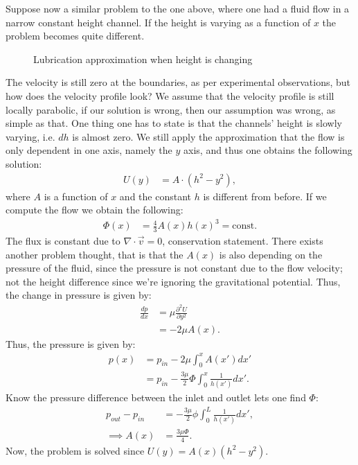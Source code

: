 \documentclass[a4paper]{article}
\begin{document}
\vspace*{0.5cm}\noindent
Suppose now a similar problem to the one above, where one had a fluid flow in a narrow constant height channel. If the height is varying as a function of $x$ the problem becomes quite different.
\begin{figure}[H]
    \centering
    \caption{Lubrication approximation when height is changing}
    \label{fig: Lubrication approximation height change}
\end{figure}\noindent
The velocity is still zero at the boundaries, as per experimental observations, but how does the velocity profile look?
We assume that the velocity profile is still locally parabolic, if our solution is wrong, then our assumption was wrong, as simple as that.
One thing one has to state is that the channels' height is slowly varying, i.e. $dh$ is almost zero. We still apply the approximation that the flow is only dependent in one axis, namely the $y$ axis, and thus one obtains the following solution:
\begin{align*}
    U(y) &= A\cdot\left(h^2 -y^2\right),
\end{align*}where $A$ is a function of $x$ and the constant $h$ is different from before. If we compute the flow we obtain the following:
\begin{align*}
    \Phi(x) &= \frac{4}{3}A(x)h(x)^3 = \text{const}.
\end{align*}The flux is constant due to $\nabla\cdot\vec{v} = 0$, conservation statement. There exists another problem thought, that is that the $A(x)$ is also depending on the pressure of the fluid, since the pressure is not constant due to the flow velocity; not the height difference since we're ignoring the gravitational potential.
Thus, the change in pressure is given by:
\begin{align*}
    \frac{d p}{d x} &= \mu\frac{\partial^2 U}{\partial y^2}\\
    &=-2\mu A(x).
\end{align*}Thus, the pressure is given by:
\begin{align*}
    p(x) &= p_{in} - 2\mu\int_0^x A(x')dx'\\
    &= p_{in} - \frac{3\mu}{2}\Phi\int_0^x\frac{1}{h(x')}dx'.
\end{align*}Know the pressure difference between the inlet and outlet lets one find $\Phi$:
\begin{align*}
    p_{out} - p_{in} &= - \frac{3\mu}{2}\phi\int_0^L\frac{1}{h(x')}dx',\\
    \implies A(x) &= \frac{3\mu\Phi}{4}.
\end{align*}Now, the problem is solved since $U(y) = A(x)(h^2 - y^2)$.
\end{document}
